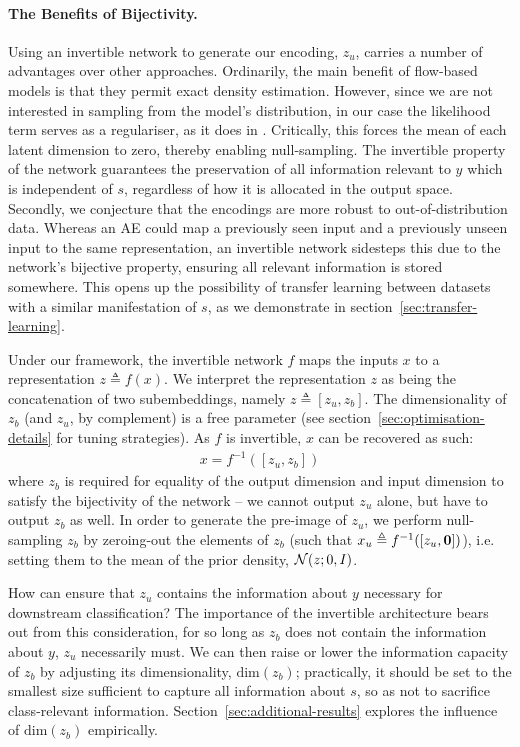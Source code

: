 \paragraph{The Benefits of Bijectivity.}
%
Using an invertible network to generate our encoding, $z_u$, carries a number of advantages
over other approaches. Ordinarily, the main benefit of flow-based models is that they permit exact
density estimation.
%
However, since we are not interested in sampling from the model's distribution, in our case the
likelihood term serves as a regulariser, as it does in \citet{JacSmeOya18}.
%
Critically, this forces the mean of each latent dimension to zero, thereby enabling null-sampling.
%
The invertible property of the network guarantees the preservation of all information relevant to
$y$ which is independent of $s$, regardless of how it is allocated in the output space. 
%
Secondly, we conjecture that the encodings are more robust to out-of-distribution data. 
%
Whereas an \acf{AE} could map a previously seen input and a previously unseen input to the same
representation, an invertible network sidesteps this due to the network's bijective property,
ensuring all relevant information is stored somewhere. 
%
This opens up the possibility of transfer learning between datasets with a similar manifestation of
$s$, as we demonstrate in section~\ref{sec:transfer-learning}.

Under our framework, the invertible network $f$ maps the inputs $x$ to a representation
$z \triangleq f(x)$.
%
We interpret the representation $z$ as being the concatenation of two subembeddings, namely \( z
\triangleq [z_u, z_b] \). 
%
The dimensionality of $z_b$ (and $z_u$, by complement) is a free parameter (see
section~\ref{sec:optimisation-details} for tuning strategies). 
%
As $f$ is invertible, $x$ can be recovered as such:
%
\begin{align}
  x = f^{-1}([z_u, z_b])
  \label{eq:zreconstruct}
\end{align}
%
where $z_b$ is required for equality of the output dimension and input dimension to satisfy
the bijectivity of the network -- we cannot output $z_u$ alone, but have to output $z_b$
as well. 
%
In order to generate the pre-image of $z_u$, we perform null-sampling \wrt{} $z_b$ by
zeroing-out the elements of $z_b$ (such that $x_u \triangleq f^{-1}([z_{u}, {\bm{0}}])$),
i.e. setting them to the mean of the prior density, ${\mathcal{N}}(z;0, I)$.

How can ensure that $z_u$ contains the information about $y$ necessary for downstream
classification?
%
The importance of the invertible architecture bears out from this consideration, for so long as
$z_b$ does not contain the information about $y$, $z_u$ necessarily must.
%
We can then raise or lower the information capacity of $z_b$ by adjusting its dimensionality, \(
\text{dim}(z_b) \); practically, it should be set to the smallest size sufficient to capture all
information about $s$, so as not to sacrifice class-relevant information. 
%
Section~\ref{sec:additional-results} explores the influence of \( \mathrm{dim}(z_b) \) empirically.

